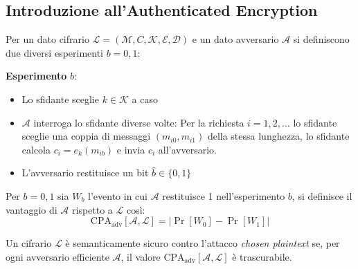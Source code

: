 \subsection{Introduzione all'Authenticated Encryption}
\begin{definition}
    Per un dato cifrario $\mathcal{L} = (\mathcal{M},C,\mathcal{K},\mathcal{E},\mathcal{D})$ e un dato avversario $\mathcal{A}$ si definiscono due diversi esperimenti $b = 0,1$:
    
    \vspace{1em}
    \noindent
    \textbf{Esperimento} $b$:
    \begin{itemize}
        \item Lo sfidante sceglie $k \in \mathcal{K}$ a caso
        \item $\mathcal{A}$ interroga lo sfidante diverse volte:
            Per la richiesta $i = 1,2,\dots$ lo sfidante sceglie una coppia di messaggi $(m_{i0}, m_{i1})$ della stessa lunghezza, lo sfidante calcola $c_i = e_k(m_{ib})$ e invia $c_i$ all'avversario.
        
        \item L'avversario restituisce un bit $\hat{b} \in \{0,1\}$
    \end{itemize}
    Per $b = 0,1$ sia $W_b$ l'evento in cui $\mathcal{A}$ restituisce 1 nell'esperimento $b$, si definisce il vantaggio di $\mathcal{A}$ rispetto a $\mathcal{L}$ così:
    \[
        \text{CPA}_\text{adv}[\mathcal{A},\mathcal{L}] = |\Pr[W_0] - \Pr[W_1]|
    \]

    Un cifrario $\mathcal{L}$ è semanticamente sicuro contro l'attacco \emph{chosen plaintext} se, per ogni avversario efficiente $\mathcal{A}$, il valore $\text{CPA}_\text{adv}[\mathcal{A},\mathcal{L}]$ è trascurabile.
\end{definition}

